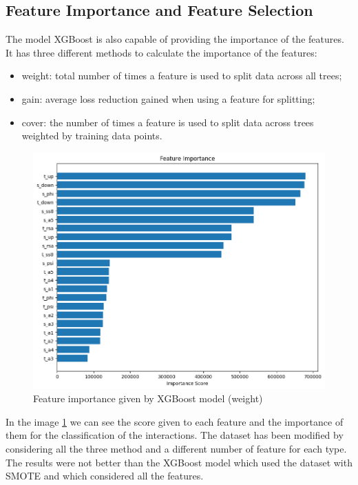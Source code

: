 \documentclass[10pt,twocolumn,letterpaper]{article}
\begin{document}
\subsection{Feature Importance and Feature Selection}
The model XGBoost is also capable of providing the importance of the features. It has three 
different methods to calculate the importance of the features: 
\begin{itemize}
    \item weight: total number of times a feature is used to split data across all trees;
    \item gain: average loss reduction gained when using a feature for splitting;
    \item cover: the number of times a feature is used to split data across trees weighted by training data points.
\end{itemize}
\begin{center}
    \begin{figure}[h!]
        \centering
        \includegraphics[scale=0.37]{img/fs.png}
        \caption{Feature importance given by XGBoost model (weight)}
        \label{fig:fs}
    \end{figure}
\end{center}
In the image \ref{fig:fs} we can see the score given to each feature and the importance of them 
for the classification of the interactions. The dataset has been modified by considering all the three method and a different number 
of feature for each type. The results were not better than the XGBoost model which used the dataset with SMOTE and which 
considered all the features.
\end{document}
